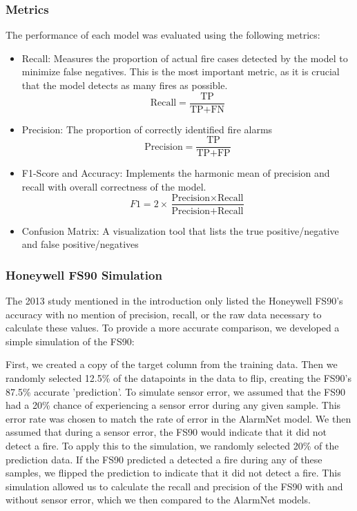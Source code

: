\documentclass[conference]{IEEEtran}
\begin{document}
\subsubsection{Metrics}
The performance of each model was evaluated using the
following metrics:
\begin{itemize}
    \item Recall: Measures the proportion of actual fire
    cases detected by the model to minimize false negatives.
    This is the most important metric, as it is crucial that
    the model detects as many fires as possible.
    \begin{equation}
        \text{Recall} = \frac{\text{TP}}{\text{TP} + \text{FN}}
    \end{equation}
    \item Precision: The proportion of correctly identified
    fire alarms
    \begin{equation}
        \text{Precision} = \frac{\text{TP}}{\text{TP} + \text{FP}}
    \end{equation}
    \item F1-Score and Accuracy: Implements the harmonic
    mean of precision and recall with overall correctness of
    the model.
    \begin{equation}
        F1 = 2 \times \frac{\text{Precision} \times \text{Recall}}{\text{Precision} + \text{Recall}}
    \end{equation}
    \item Confusion Matrix: A visualization tool that lists
    the true positive/negative and false positive/negatives
\end{itemize}

\subsubsection{Honeywell FS90 Simulation}
The 2013 study mentioned in the introduction only listed the
Honeywell FS90's accuracy with no mention of precision,
recall, or the raw data necessary to calculate these
values\cite{smokeacc}. To provide a more accurate
comparison, we developed a simple simulation of the FS90:

First, we created a copy of the target column from the
training data. Then we randomly selected 12.5\% of the
datapoints in the data to flip, creating the FS90's 87.5\%
accurate 'prediction'. To simulate sensor error, we assumed
that the FS90 had a 20\% chance of experiencing a sensor
error during any given sample. This error rate was chosen to
match the rate of error in the AlarmNet model. We then
assumed that during a sensor error, the FS90 would indicate
that it did not detect a fire. To apply this to the
simulation, we randomly selected 20\% of the prediction
data. If the FS90 predicted a detected a fire during any of
these samples, we flipped the prediction to indicate that it
did not detect a fire. This simulation allowed us to
calculate the recall and precision of the FS90 with and
without sensor error, which we then compared to the AlarmNet
models.
\end{document}
